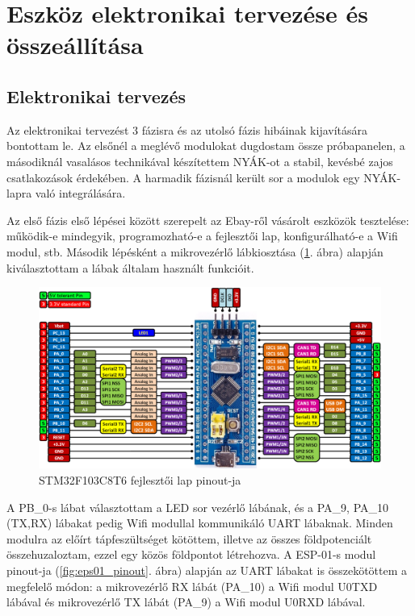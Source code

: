 \documentclass[../main.tex]{subfiles}
\begin{document}
\section{Eszköz elektronikai tervezése és összeállítása}
    \subsection{Elektronikai tervezés}
        Az elektronikai tervezést 3 fázisra és az utolsó fázis hibáinak kijavítására bontottam le. Az elsőnél a meglévő modulokat dugdostam össze próbapanelen, a másodiknál vasalásos technikával készítettem NYÁK-ot a stabil, kevésbé zajos csatlakozások érdekében. A harmadik fázisnál került sor a modulok egy NYÁK-lapra való integrálására.
        
        Az első fázis első lépései között szerepelt az Ebay-ről vásárolt eszközök tesztelése: működik-e mindegyik, programozható-e a fejlesztői lap, konfigurálható-e a Wifi modul, stb. Második lépésként a mikrovezérlő lábkiosztása (\ref{fig:stm32f103_pinout}. ábra) alapján kiválasztottam a lábak általam használt funkcióit. 
        
        \begin{figure}[h!]
            \centering
                \includegraphics[width=14cm]{resources/pcb_res/stm32f103c8t6_pinout.png}
            \caption{STM32F103C8T6 fejlesztői lap pinout-ja \citep{armMbed}}
            \label{fig:stm32f103_pinout}
        \end{figure}
        
        A PB\_0-s lábat választottam a LED sor vezérlő lábának, és a PA\_9, PA\_10 (TX,RX) lábakat pedig Wifi modullal kommunikáló UART lábaknak. Minden modulra az előírt tápfeszültséget kötöttem, illetve az összes földpotenciált összehuzaloztam, ezzel egy közös földpontot létrehozva. A ESP-01-s modul pinout-ja (\ref{fig:eps01_pinout}. ábra) alapján az UART lábakat is összekötöttem a megfelelő módon: a mikrovezérlő RX lábát (PA\_10) a Wifi modul U0TXD lábával és mikrovezérlő TX lábát (PA\_9) a Wifi modul U0RXD lábával. 
        
\end{document}
